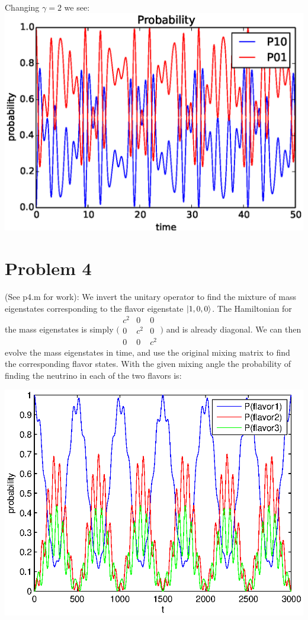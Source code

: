 \documentclass[a4paper,12pt]{article}
\numberwithin{equation}{section}
\begin{document}
\\
Changing $\gamma=2$ we see:\\
\includegraphics{p3_e1y2w1}

\section{Problem 4}
(See p4.m for work): We invert the unitary operator to find the mixture of mass eigenstates corresponding to the flavor eigenstate $\ket{1,0,0}$.
The Hamiltonian for the mass eigenstates is simply $\bigl( \begin{smallmatrix}c^2 & 0 & 0\\ 0 & c^2 & 0 \\ 0 & 0 & c^2\end{smallmatrix} \bigr )$ and is already diagonal.
We can then evolve the mass eigenstates in time, and use the original mixing matrix to find the corresponding flavor states. 
With the given mixing angle the probability of finding the neutrino in each of the two flavors is:

\includegraphics{p4}
\end{document}
